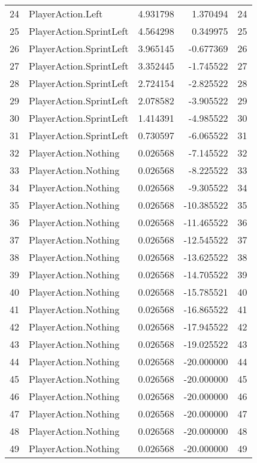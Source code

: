 \begin{tabular}{llrrr}
24 & PlayerAction.Left & 4.931798 & 1.370494 & 24 \\
25 & PlayerAction.SprintLeft & 4.564298 & 0.349975 & 25 \\
26 & PlayerAction.SprintLeft & 3.965145 & -0.677369 & 26 \\
27 & PlayerAction.SprintLeft & 3.352445 & -1.745522 & 27 \\
28 & PlayerAction.SprintLeft & 2.724154 & -2.825522 & 28 \\
29 & PlayerAction.SprintLeft & 2.078582 & -3.905522 & 29 \\
30 & PlayerAction.SprintLeft & 1.414391 & -4.985522 & 30 \\
31 & PlayerAction.SprintLeft & 0.730597 & -6.065522 & 31 \\
32 & PlayerAction.Nothing & 0.026568 & -7.145522 & 32 \\
33 & PlayerAction.Nothing & 0.026568 & -8.225522 & 33 \\
34 & PlayerAction.Nothing & 0.026568 & -9.305522 & 34 \\
35 & PlayerAction.Nothing & 0.026568 & -10.385522 & 35 \\
36 & PlayerAction.Nothing & 0.026568 & -11.465522 & 36 \\
37 & PlayerAction.Nothing & 0.026568 & -12.545522 & 37 \\
38 & PlayerAction.Nothing & 0.026568 & -13.625522 & 38 \\
39 & PlayerAction.Nothing & 0.026568 & -14.705522 & 39 \\
40 & PlayerAction.Nothing & 0.026568 & -15.785521 & 40 \\
41 & PlayerAction.Nothing & 0.026568 & -16.865522 & 41 \\
42 & PlayerAction.Nothing & 0.026568 & -17.945522 & 42 \\
43 & PlayerAction.Nothing & 0.026568 & -19.025522 & 43 \\
44 & PlayerAction.Nothing & 0.026568 & -20.000000 & 44 \\
45 & PlayerAction.Nothing & 0.026568 & -20.000000 & 45 \\
46 & PlayerAction.Nothing & 0.026568 & -20.000000 & 46 \\
47 & PlayerAction.Nothing & 0.026568 & -20.000000 & 47 \\
48 & PlayerAction.Nothing & 0.026568 & -20.000000 & 48 \\
49 & PlayerAction.Nothing & 0.026568 & -20.000000 & 49 \\
\bottomrule
\end{tabular}
